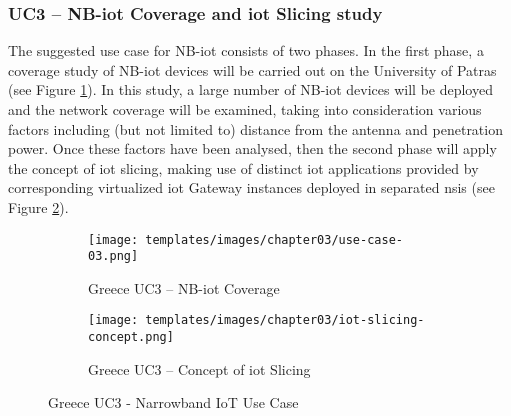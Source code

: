 	\subsubsection{UC3 – NB-\acrshort{iot} Coverage and \acrshort{iot} Slicing study}
	The suggested use case for NB-\acrshort{iot} consists of two phases. In the first phase, a coverage study of NB-\acrshort{iot} devices will be carried out on the University of Patras (see Figure \ref{fig:uc3}). In this study, a large number of NB-\acrshort{iot} devices will be deployed and the network coverage will be examined, taking into consideration various factors including (but not limited to) distance from the antenna and penetration power. Once these factors have been analysed, then the second phase will apply the concept of \acrshort{iot} slicing, making use of distinct \acrshort{iot} applications provided by corresponding virtualized \acrshort{iot} Gateway instances deployed in separated \acrshort{nsi}s (see Figure \ref{fig:subim2}).
\medskip
    \begin{figure}[!h]
        \begin{subfigure}{\linewidth}
            \centering
            \texttt{[image: templates/images/chapter03/use-case-03.png]} 
            \caption{Greece UC3 – NB-\acrshort{iot} Coverage}
            \label{fig:uc3}
        \end{subfigure}
        \hfill
        \begin{subfigure}{\linewidth}
            \centering
            \texttt{[image: templates/images/chapter03/iot-slicing-concept.png]}
            \caption{Greece UC3 – Concept of \acrshort{iot} Slicing}
            \label{fig:subim2}
        \end{subfigure}
        \hfill
        \caption{Greece UC3 - Narrowband IoT Use Case}
        \label{fig:iot-slicing-concept}
    \end{figure}
\newpage	
